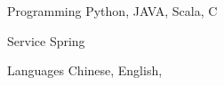 

\begin{cvskills}

  \cvskill
    {Programming} %
    {Python, JAVA, Scala, C} %

  \cvskill
    {Service} %
    {Spring} %

  \cvskill
    {Languages} %
    {Chinese, English,} %

\end{cvskills}
